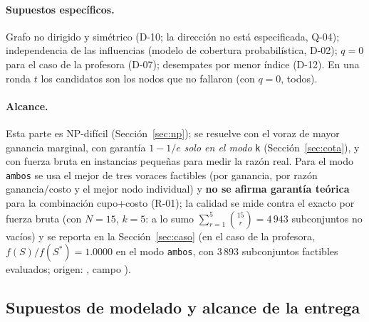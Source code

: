 \paragraph{Supuestos específicos.} Grafo no dirigido y simétrico (D-10; la dirección no está especificada, Q-04); independencia de las influencias (modelo de cobertura probabilística, D-02); $q=0$ para el caso de la profesora (D-07); desempates por menor índice (D-12). En una ronda $t$ los candidatos son los nodos que no fallaron (con $q=0$, todos).

\paragraph{Alcance.} Esta parte es NP-difícil (Sección~\ref{sec:np}); se resuelve con el voraz de mayor ganancia marginal, con garantía $1-1/e$ \emph{solo en el modo} \texttt{k} (Sección~\ref{sec:cota}), y con fuerza bruta en instancias pequeñas para medir la razón real. Para el modo \texttt{ambos} se usa el mejor de tres voraces factibles (por ganancia, por razón ganancia/costo y el mejor nodo individual) y \textbf{no se afirma garantía teórica} para la combinación cupo+costo (R-01); la calidad se mide contra el exacto por fuerza bruta (con $N=15$, $k=5$: a lo sumo $\sum_{r=1}^{5}\binom{15}{r}=4\,943$ subconjuntos no vacíos) y se reporta en la Sección~\ref{sec:caso} (en el caso de la profesora, $f(S)/f(S^\ast)=1.0000$ en el modo \texttt{ambos}, con $3\,893$ subconjuntos factibles evaluados; origen: , campo ).

\subsection{Supuestos de modelado y alcance de la entrega}\label{sec:supuestos}

